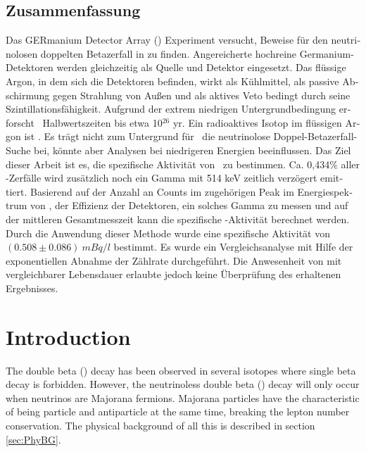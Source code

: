 \documentclass[encoding=utf8,british]{tumphthesis}
\begin{document}
\begin{otherlanguage}{ngerman}
\chapter*{Zusammenfassung}
Das GERmanium Detector Array (\gerda) Experiment versucht, Beweise für den neutrinolosen doppelten Betazerfall in  zu finden.
Angereicherte hochreine Germanium-Detektoren werden gleichzeitig als Quelle und Detektor eingesetzt.
Das flüssige Argon, in dem sich die Detektoren befinden, wirkt als Kühlmittel, als passive Abschirmung gegen Strahlung von Außen und als aktives Veto bedingt durch seine Szintillationsfähigkeit.
Aufgrund der extrem niedrigen Untergrundbedingung erforscht \gerda\ Halbwertszeiten bis etwa 10$^{26}$ yr.
Ein radioaktives Isotop im flüssigen Argon ist .
Es trägt nicht zum Untergrund für \gerdas\ die neutrinolose Doppel-Betazerfall-Suche bei, könnte aber Analysen bei niedrigeren Energien beeinflussen.
Das Ziel dieser Arbeit ist es, die spezifische Aktivität von \Kr\ zu bestimmen.
Ca. 0,434$\%$ aller \Kr-Zerfälle wird zusätzlich noch ein Gamma mit 514 keV zeitlich verzögert  emittiert.
Basierend auf der Anzahl an Counts im zugehörigen Peak im Energiespektrum von \gerda, der Effizienz der Detektoren, ein solches Gamma zu messen und auf der mittleren Gesamtmesszeit kann die spezifische \Kr-Aktivität berechnet werden.
Durch die Anwendung dieser Methode wurde eine spezifische Aktivität von $(0.508\pm0.086) \   \unit{mBq}/ \unit{l}$ bestimmt.
Es wurde ein Vergleichsanalyse mit Hilfe der exponentiellen Abnahme der Zählrate durchgeführt.
Die Anwesenheit von  mit vergleichbarer Lebensdauer erlaubte jedoch keine Überprüfung des erhaltenen Ergebnisses.

\end{otherlanguage}

\tableofcontents

\mainmatter

\chapter{Introduction}
\label{sec:intro}

The double beta (\twonu) decay has been observed in several isotopes where single beta decay is forbidden.
However, the neutrinoless double beta (\onbb) decay will only occur when neutrinos are Majorana fermions.
Majorana particles have the characteristic of being particle and antiparticle at the same time, breaking the lepton number conservation. \cite{bilenky_massive_1987}
The physical background of all this is described in section \ref{sec:PhyBG}.
\\
\end{document}
